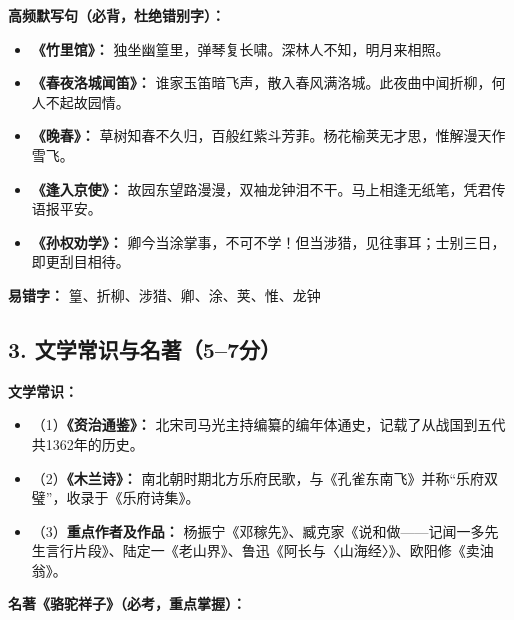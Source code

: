 \textbf{高频默写句（必背，杜绝错别字）：}

\begin{itemize}[leftmargin=*]
    \item \textbf{《竹里馆》：} 独坐幽篁里，弹琴复长啸。深林人不知，明月来相照。
    \item \textbf{《春夜洛城闻笛》：} 谁家玉笛暗飞声，散入春风满洛城。此夜曲中闻折柳，何人不起故园情。
    \item \textbf{《晚春》：} 草树知春不久归，百般红紫斗芳菲。杨花榆荚无才思，惟解漫天作雪飞。
    \item \textbf{《逢入京使》：} 故园东望路漫漫，双袖龙钟泪不干。马上相逢无纸笔，凭君传语报平安。
    \item \textbf{《孙权劝学》：} 卿今当涂掌事，不可不学！但当涉猎，见往事耳；士别三日，即更刮目相待。
\end{itemize}

\textbf{易错字：} 篁、折柳、涉猎、卿、涂、荚、惟、龙钟

\subsection*{3. 文学常识与名著（5--7分）}

\textbf{文学常识：}

\begin{itemize}[leftmargin=*]
    \item （1）\textbf{《资治通鉴》：} 北宋司马光主持编纂的编年体通史，记载了从战国到五代共1362年的历史。
    \item （2）\textbf{《木兰诗》：} 南北朝时期北方乐府民歌，与《孔雀东南飞》并称“乐府双璧”，收录于《乐府诗集》。
    \item （3）\textbf{重点作者及作品：} 杨振宁《邓稼先》、臧克家《说和做——记闻一多先生言行片段》、陆定一《老山界》、鲁迅《阿长与〈山海经〉》、欧阳修《卖油翁》。
\end{itemize}

\textbf{名著《骆驼祥子》（必考，重点掌握）：}

